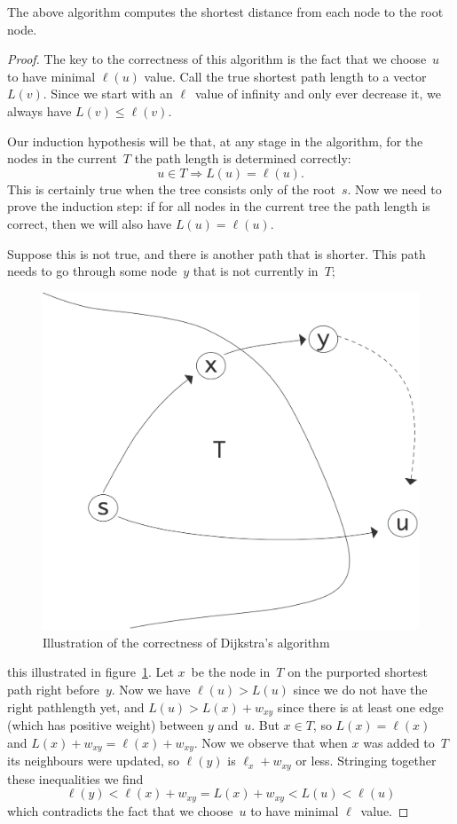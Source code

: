 \begin{theorem}
  The above algorithm computes the shortest distance from each
  node to the root node.
\end{theorem}
\begin{proof}
  The key to the correctness of this algorithm is the fact that
  we choose~$u$ to have minimal $\ell(u)$ value. Call the true shortest path
  length to a vector~$L(v)$. Since we start with an $\ell$~value of infinity and
  only ever decrease it, we always have $L(v)\leq\ell(v)$.

  Our induction hypothesis will be that, at any stage in the algorithm,
  for the nodes in the current~$T$ the path length is determined correctly:
  \[ u\in T\Rightarrow L(u)=\ell(u). \]
  This is certainly true when the tree consists only of the root~$s$.
  Now we need to prove the induction step: if for all nodes in the
  current tree the path length is correct, then we will also 
  have $L(u)=\ell(u)$. 

  Suppose this is not true, and there is another path that is shorter.
  This path needs to go through some node~$y$ that is not currently in~$T$;
  \begin{figure}[ht]
    \includegraphics[scale=.12]{graphics/dijkstra-proof}
    \caption{Illustration of the correctness of Dijkstra's algorithm}
    \label{fig:dijkstra-proof}
  \end{figure}
  this illustrated in figure~\ref{fig:dijkstra-proof}.
  Let $x$~be the node in~$T$ on the purported shortest path right before~$y$.
  Now we have $\ell(u)>L(u)$ since we do not have the right pathlength
  yet, and $L(u)>L(x)+w_{xy}$ since there is at least one edge (which has 
  positive weight) between $y$ and~$u$. But $x\in T$, so $L(x)=\ell(x)$
  and $L(x)+w_{xy}=\ell(x)+w_{xy}$. Now we observe that when $x$ was
  added to~$T$ its neighbours were updated, so $\ell(y)$ is $\ell_x+w_{xy}$ or less.
  Stringing together these inequalities we find 
  \[ \ell(y)<\ell(x)+w_{xy}=L(x)+w_{xy}<L(u)<\ell(u) \]
  which contradicts the fact that we choose~$u$ to have minimal $\ell$~value.
\end{proof}

